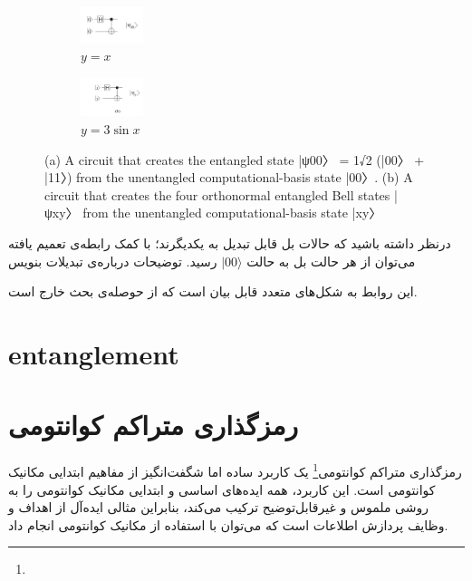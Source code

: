 \documentclass{book}
\begin{document}
\begin{figure}
	\centering
	\begin{subfigure}[b]{}
		\centering
		\includegraphics[width=0.2\textwidth]{psi00.png}
		\caption{$y=x$}
		\label{fig:y equals x}
	\end{subfigure}
	\hfill
	\begin{subfigure}[b]{}
		\centering
		\includegraphics[width=0.2\textwidth]{psixy.png}
		\caption{$y=3\sin x$}
		\label{fig:three sin x}
	\end{subfigure}
	\caption{(a) A circuit that creates the entangled state
		|ψ00〉 = 1√2
		(|00〉 + |11〉) from the unentangled computational-basis
		state |00〉. (b) A circuit that creates the four orthonormal entangled
		Bell states |ψxy〉 from the unentangled computational-basis state |xy〉}
	\label{fig:three graphs}
\end{figure}


درنظر داشته باشید که حالات بل قابل تبدیل به یکدیگرند؛ با کمک رابطه‌ی تعمیم یافته ‌می‌توان از هر حالت بل به حالت $\vert00 \rangle$ رسید.
توضیحات درباره‌ی تبدیلات بنویس

این روابط به شکل‌های متعدد قابل بیان است که از حوصله‌ی بحث خارج است.
\newpage






\section{entanglement}
\newpage



\section{رمزگذاری متراکم کوانتومی}

رمزگذاری متراکم کوانتومی\footnote{} یک کاربرد ساده اما شگفت‌انگیز از مفاهیم ابتدایی مکانیک کوانتومی است. این کاربرد، همه ایده‌های اساسی و ابتدایی مکانیک کوانتومی را به روشی ملموس و غیرقابل‌توضیح ترکیب می‌کند، بنابراین مثالی ایده‌آل از اهداف و وظایف پردازش اطلاعات است که می‌توان با استفاده از مکانیک کوانتومی انجام داد.
\end{document}
